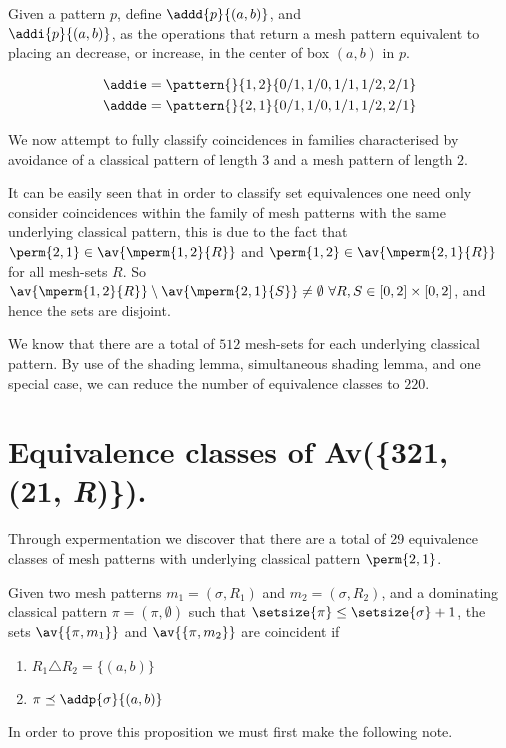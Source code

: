 \begin{definition}
    Given a pattern \(p\), define \(\addd{p}{(a,b)}\), and \\ \(\addi{p}{(a,b)}\),
    as the operations that return a mesh pattern equivalent to placing an
    decrease, or increase, in the center of box \((a,b)\) in \(p\).
\end{definition}

\begin{example}
    \begin{align*}
        \addie = \pattern{}{1,2}{0/1,1/0,1/1,1/2,2/1}\\
        \addde = \pattern{}{2,1}{0/1,1/0,1/1,1/2,2/1}
    \end{align*}
\end{example}

We now attempt to fully classify coincidences in families characterised by avoidance
of a classical pattern of length \(3\) and a mesh pattern of length \(2\).

It can be easily seen that in order to classify set equivalences one need only
consider coincidences within the family of mesh patterns with the same underlying
classical pattern, this is due to the fact that \(\perm{2,1}\in\av{\mperm{1,2}{R}}\)
and \(\perm{1,2}\in\av{\mperm{2,1}{R}}\) for all mesh-sets \(R\). So
\(\av{\mperm{1,2}{R}}\setminus \av{\mperm{2,1}{S}}\neq \emptyset\ \forall
R,S\in [0,2]\times [0,2]\), and hence the sets are disjoint.

We know that there are a total of \(512\) mesh-sets for each underlying classical
pattern. By use of the shading lemma, simultaneous shading lemma, and
one special case, we can reduce the number of equivalence classes to \(220\).

\section{Equivalence classes of Av(\{321, (21, \textit{R})\}).}
Through expermentation we discover that there are a total of 29 equivalence
classes of mesh patterns with underlying classical pattern \(\perm{2,1}\).

\begin{proposition}
    \label{prop:dom1}
    Given two mesh patterns \(m_1 =(\sigma, R_1)\) and \(m_2 = (\sigma, R_2)\),
    and a dominating classical pattern \(\pi = (\pi,\emptyset)\) such that
    \(\setsize{\pi} \le \setsize{\sigma} + 1\), the sets \(\av{\{\pi,m_1\}}\) and
    \(\av{\{\pi,m_2\}}\) are coincident if

    \begin{enumerate}
        \item \(R_1 \triangle R_2 = \{(a,b)\}\)
        \item \(\pi \preceq \addp{\sigma}{(a,b)}\)\label{prop:dom1:cont}
    \end{enumerate}
\end{proposition}
In order to prove this proposition we must first make the following note.

